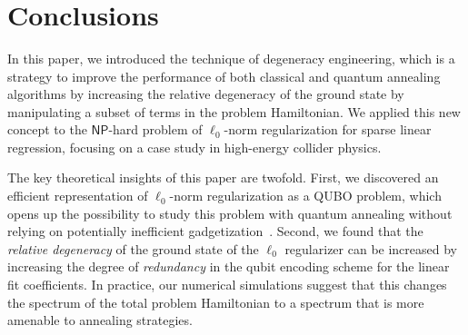 \documentclass[aps,prd,twocolumn, superscriptaddress,preprintnumbers, nofootinbib,longbibliography,floatfix]{revtex4-2}
\DeclareRobustCommand{\Tab}[1]{Table~\ref{#1}}
\DeclareRobustCommand{\Fig}[1]{Fig.~\ref{#1}}
\begin{document}
\begin{figure*}
\centering
{}
\\
\\
\\
	\caption{
	Same as \Fig{fig:double_vs_single_nnz}, but comparing classical annealing (solid blue) to PIMC (dashed blue) as a proxy for quantum annealing, using the double ABE.
	As discussed in footnote \ref{footnote:burnt}, \Fig{fig:charger2} has been replaced by a burnt charger. The (a)--(l) are defined in \Tab{tab:observables}.}
	\label{fig:classic_vs_pimc_nnz}
\end{figure*}


\section{Conclusions}
\label{sec:conclude}


In this paper, we introduced the technique of degeneracy engineering, which is a strategy to improve the performance of both classical and quantum annealing algorithms by increasing the relative degeneracy of the ground state by manipulating a subset of terms in the problem Hamiltonian.
%
We applied this new concept to the $\textsf{NP}$-hard problem of $\ell_0$-norm regularization for sparse linear regression, focusing on a case study in high-energy collider physics.


The key theoretical insights of this paper are twofold. 
%
First, we discovered an efficient representation of $\ell_0$-norm regularization as a QUBO problem, which opens up the possibility to study this problem with quantum annealing without relying on potentially inefficient gadgetization~\cite{dattani2019quadratization}.
%
Second, we found that the \emph{relative degeneracy} of the ground state of the $\ell_0$ regularizer can be increased by increasing the degree of \textit{redundancy} in the qubit encoding scheme for the linear fit coefficients.
%
In practice, our numerical simulations suggest that this changes the spectrum of the total problem Hamiltonian to a spectrum that is more amenable to annealing strategies.
\end{document}
